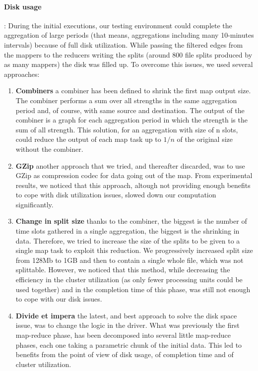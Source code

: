 \paragraph{Disk usage}: During the initial executions, our testing environment
could complete the aggregation of large periods (that means,
aggregations including many 10-minutes intervals) because of full
disk utilization. 
While passing the filtered edges from the mappers to the reducers
writing the splits (around 800 file splits produced by
as many mappers) the disk was filled up.
To overcome this issues, we used several approaches:
\begin{enumerate}
\item \textbf{Combiners} a combiner has been defined to shrink the first map output size. The combiner performs a sum over all strengths in the same aggregation period and, of course, with same source and destination. 
The output of the combiner is a graph for each aggregation period in which the strength is the sum of all strength.
This solution, for an aggregation with size of n slots, could reduce the output of each map task up to $1/n$ of the original size without the combiner.
\item \textbf{GZip} another approach that we tried, and thereafter discarded, was to use GZip as compression codec for data going out of the map. From experimental results, we noticed that this approach, altough not providing enough benefits
to cope with disk utilization issues, slowed down our computation significantly.
\item \textbf{Change in split size} thanks to the combiner, the biggest is the number of time slots gathered in a single aggregation, the biggest is the shrinking in data. 
Therefore, we tried to increase the size of the splits to be given to a single map task to exploit this reduction. We progressively increased split size from 128Mb to 1GB and then to contain a single whole file, which was not splittable.
However, we noticed that this method, while decreasing the efficiency in the cluster utilization (as only fewer processing units could be used together) and in the completion time of this phase, was still not enough to cope with our disk issues.
\item \textbf{Divide et impera} the latest, and best approach to solve the disk space issue, was to change the logic in the driver. What was previously the first map-reduce phase, has been decomposed into several little map-reduce phases, each one taking a parametric
chunk of the initial data. This led to benefits from the point of view of disk usage, of completion time and of cluster utilization.
\end{enumerate}

